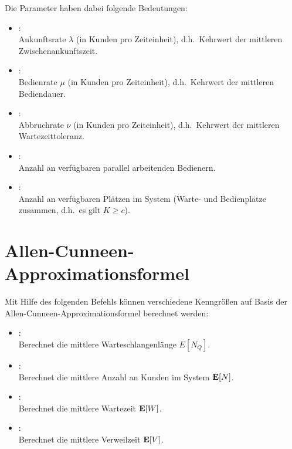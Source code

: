Die Parameter haben dabei folgende Bedeutungen:
\begin{itemize}
\item
{}:\\
Ankunftsrate $\lambda$ (in Kunden pro Zeiteinheit), d.h.\ Kehrwert der mittleren Zwischenankunftszeit.
\item
{}:\\
Bedienrate $\mu$ (in Kunden pro Zeiteinheit), d.h.\ Kehrwert der mittleren Bediendauer.
\item
{}:\\
Abbruchrate $\nu$ (in Kunden pro Zeiteinheit), d.h.\ Kehrwert der mittleren Wartezeittoleranz.
\item
{}:\\
Anzahl an verfügbaren parallel arbeitenden Bedienern.
\item
{}:\\
Anzahl an verfügbaren Plätzen im System (Warte- und Bedienplätze zusammen, d.h.\ es gilt $K\ge c$).
\end{itemize}



\chapter{Allen-Cunneen-Approximationsformel}

Mit Hilfe des folgenden Befehls können verschiedene Kenngrößen auf Basis der
Allen-Cunneen-Approxi\-ma\-ti\-ons\-for\-mel berechnet werden:

\begin{itemize}

\item
{}:\\
Berechnet die mittlere Warteschlangenlänge $E[N_Q]$. 

\item
{}:\\
Berechnet die mittlere Anzahl an Kunden im System ${\bf E}[N]$.

\item
{}:\\
Berechnet die mittlere Wartezeit ${\bf E}[W]$.

\item
{}:\\
Berechnet die mittlere Verweilzeit ${\bf E}[V]$.
\end{itemize}

